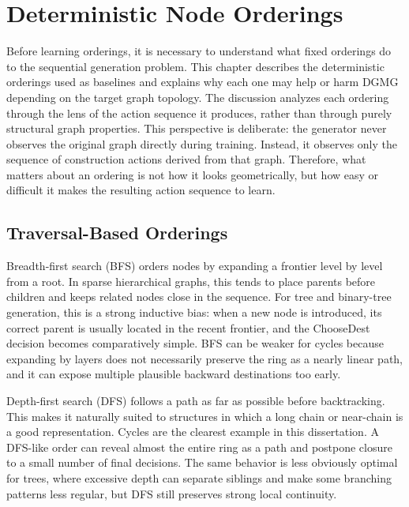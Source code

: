 \chapter{Deterministic Node Orderings}
\label{chap:deterministic-orderings}

Before learning orderings, it is necessary to understand what fixed orderings do to the sequential generation problem. This chapter describes the deterministic orderings used as baselines and explains why each one may help or harm DGMG depending on the target graph topology. The discussion analyzes each ordering through the lens of the action sequence it produces, rather than through purely structural graph properties. This perspective is deliberate: the generator never observes the original graph directly during training. Instead, it observes only the sequence of construction actions derived from that graph. Therefore, what matters about an ordering is not how it looks geometrically, but how easy or difficult it makes the resulting action sequence to learn.

\section{Traversal-Based Orderings}
\label{sec:traversal-orderings}

Breadth-first search (BFS) orders nodes by expanding a frontier level by level from a root. In sparse hierarchical graphs, this tends to place parents before children and keeps related nodes close in the sequence. For tree and binary-tree generation, this is a strong inductive bias: when a new node is introduced, its correct parent is usually located in the recent frontier, and the ChooseDest decision becomes comparatively simple. BFS can be weaker for cycles because expanding by layers does not necessarily preserve the ring as a nearly linear path, and it can expose multiple plausible backward destinations too early.

Depth-first search (DFS) follows a path as far as possible before backtracking. This makes it naturally suited to structures in which a long chain or near-chain is a good representation. Cycles are the clearest example in this dissertation. A DFS-like order can reveal almost the entire ring as a path and postpone closure to a small number of final decisions. The same behavior is less obviously optimal for trees, where excessive depth can separate siblings and make some branching patterns less regular, but DFS still preserves strong local continuity.

